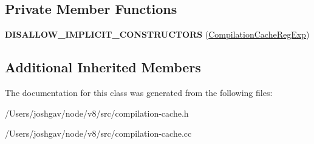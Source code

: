 \subsection*{Private Member Functions}
\begin{DoxyCompactItemize}
\item 
{\bfseries D\+I\+S\+A\+L\+L\+O\+W\+\_\+\+I\+M\+P\+L\+I\+C\+I\+T\+\_\+\+C\+O\+N\+S\+T\+R\+U\+C\+T\+O\+RS} (\hyperlink{classv8_1_1internal_1_1_compilation_cache_reg_exp}{Compilation\+Cache\+Reg\+Exp})\hypertarget{classv8_1_1internal_1_1_compilation_cache_reg_exp_ad8dd626792fc100ab37618a38386dca0}{}\label{classv8_1_1internal_1_1_compilation_cache_reg_exp_ad8dd626792fc100ab37618a38386dca0}

\end{DoxyCompactItemize}
\subsection*{Additional Inherited Members}


The documentation for this class was generated from the following files\+:\begin{DoxyCompactItemize}
\item 
/\+Users/joshgav/node/v8/src/compilation-\/cache.\+h\item 
/\+Users/joshgav/node/v8/src/compilation-\/cache.\+cc\end{DoxyCompactItemize}
